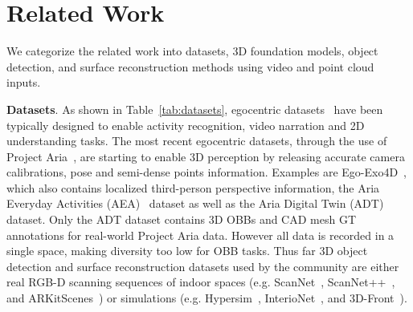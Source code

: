 \section{Related Work}
We categorize the related work into datasets, 3D foundation models, object detection, and surface reconstruction methods using video and point cloud inputs. 


\noindent\textbf{Datasets}. 
As shown in Table~\ref{tab:datasets}, egocentric datasets~\cite{grauman2023egoexo,grauman2022ego4d,lee2012discovering,Damen2018EPICKITCHENS,northcutt2020egocom} have been typically designed to enable activity recognition, video narration and 2D understanding tasks. The most recent egocentric datasets, through the use of Project Aria~\cite{engel2023project}, are starting to enable 3D perception by releasing accurate camera calibrations, pose and semi-dense points information. Examples are Ego-Exo4D~\cite{grauman2023egoexo}, which also contains localized third-person perspective information, the Aria Everyday Activities (AEA)~\cite{lv2024aria} dataset as well as the Aria Digital Twin (ADT)~\cite{Pan_2023_ICCV} dataset. Only the ADT dataset contains 3D OBBs and CAD mesh GT annotations for real-world Project Aria data. However all data is recorded in a single space, making diversity too low for OBB tasks.
Thus far 3D object detection and surface reconstruction datasets used by the community are either real RGB-D scanning sequences of indoor spaces (e.g. ScanNet~\cite{dai2017scannet,Avetisyan_2019_CVPR}, ScanNet++~\cite{yeshwanthliu2023scannetpp}, and  ARKitScenes~\cite{dehghan2021arkitscenes}) or simulations (e.g. Hypersim~\cite{roberts2021hypersim}, InterioNet~\cite{InteriorNet18}, and 3D-Front~\cite{fu20213dfront}).   
%
%
